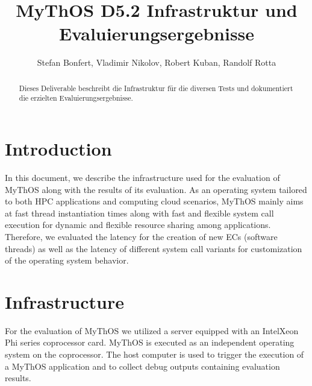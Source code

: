 

\title{MyThOS D5.2 Infrastruktur und Evaluierungsergebnisse}
\author{Stefan Bonfert, Vladimir Nikolov, Robert Kuban, Randolf Rotta}



\maketitle

\begin{abstract}

Dieses Deliverable beschreibt die Infrastruktur für die diversen Tests und
dokumentiert die erzielten Evaluierungsergebnisse.

\end{abstract}

\newpage
\tableofcontents


\section{Introduction}
\label{sec:introduction}
In this document, we describe the infrastructure used for the evaluation of
MyThOS along with the results of its evaluation. As an operating system tailored
to both HPC applications and computing cloud scenarios, MyThOS mainly aims at
fast thread instantiation times along with fast and flexible system call
execution for dynamic and flexible resource sharing among applications.
Therefore, we evaluated the latency for the creation of new ECs (software
threads) as well as the latency of different system call variants for
customization of the operating system behavior.

\section{Infrastructure}
\label{sec:infrastructure}
For the evaluation of MyThOS we utilized a server equipped with an
Intel\textcopyright Xeon Phi series coprocessor card. MyThOS
is executed as an independent operating system on the coprocessor. The host
computer is used to trigger the execution of a MyThOS application and to collect
debug outputs containing evaluation results.

